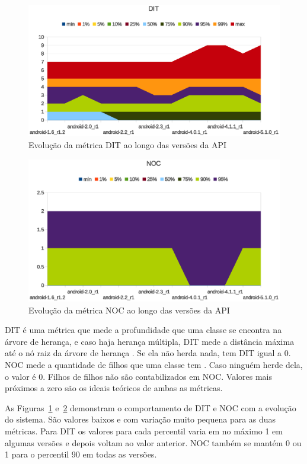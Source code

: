 \begin{figure}[!htb]
\centering
\includegraphics [keepaspectratio=true,scale=0.85]{figuras/graphs/dit_android.eps}
\caption{Evolução da métrica DIT ao longo das versões da API}
\label{fig:dit_android}
\end{figure}

\begin{figure}[!htb]
\centering
\includegraphics [keepaspectratio=true,scale=0.85]{figuras/graphs/noc_android.eps}
\caption{Evolução da métrica NOC ao longo das versões da API}
\label{fig:noc_android}
\end{figure}

DIT é uma métrica que mede a profundidade que uma classe se encontra na árvore de herança, e caso haja herança múltipla, DIT mede a distância máxima até o nó raiz da árvore de herança \cite{chidamberkemerer}. Se ela não herda nada, tem DIT igual a 0. NOC mede a quantidade de filhos que uma classe tem \cite{chidamberkemerer}. Caso ninguém herde dela, o valor é 0. Filhos de filhos não são contabilizados em NOC. Valores mais próximos a zero são os ideais teóricos de ambas as métricas.

As Figuras~\ref{fig:dit_android} e~\ref{fig:noc_android} demonstram o comportamento de DIT e NOC com a evolução do sistema. São valores baixos e com variação muito pequena para as duas métricas. Para DIT os valores para cada percentil varia em no máximo 1 em algumas versões e depois voltam ao valor anterior. NOC também se mantém 0 ou 1 para o percentil 90 em todas as versões.


